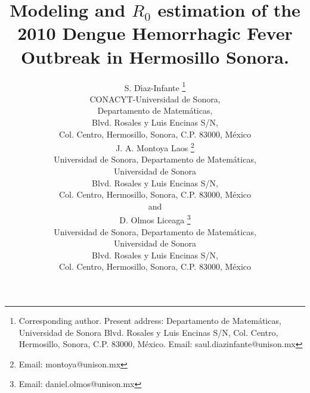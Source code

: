 \documentclass[11pt]{imammb}
\numberwithin{equation}{section}
\begin{document}
    \title{
        Modeling and $R_0$ estimation  of the 2010 Dengue Hemorrhagic Fever 
        Outbreak in Hermosillo Sonora.
    }    
    \author{%
        {\sc S. D\'{\i}az-Infante%
            \footnote{
                Corresponding author. 
                Present address: Departamento de Matem\'aticas,
                Universidad de Sonora Blvd. Rosales y Luis Encinas S/N,
                Col. Centro, Hermosillo, Sonora, C.P. 83000,
                M\'exico. Email: saul.diazinfante@unison.mx
                }
        }\\[2pt]
        CONACYT-Universidad de Sonora, \\[6pt]
        Departamento de Matem\'aticas, \\[6pt]
        Blvd. Rosales y Luis Encinas S/N, \\[6pt] 
        Col. Centro, Hermosillo, Sonora, C.P. 83000,
        M\'exico\\ 
        {\sc J. A. Montoya Laos 
            \footnote{Email: montoya@unison.mx}
        }\\[2pt]   
        Universidad de Sonora,
        Departamento de Matem\'aticas, \\[6pt] 
        Universidad de Sonora \\[6pt]
        Blvd. Rosales y Luis Encinas S/N, \\[6pt] 
        Col. Centro, Hermosillo, Sonora, C.P. 83000,
        M\'exico\\ 
        { \sc and
            \\
             D. Olmos Liceaga 
            \footnote{Email: daniel.olmos@unison.mx}
        }\\[2pt]   
        Universidad de Sonora,
        Departamento de Matem\'aticas, \\[6pt] 
        Universidad de Sonora \\[6pt]
        Blvd. Rosales y Luis Encinas S/N, \\[6pt] 
        Col. Centro, Hermosillo, Sonora, C.P. 83000,
        M\'exico\\ 
    }
%
    \pagestyle{headings}
    \maketitle
\end{document}
